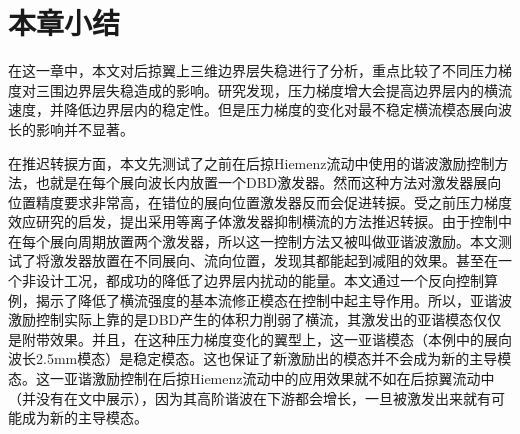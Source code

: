 \section{本章小结}
在这一章中，本文对后掠翼上三维边界层失稳进行了分析，重点比较了不同压力梯度对三围边界层失稳造成的影响。研究发现，压力梯度增大会提高边界层内的横流速度，并降低边界层内的稳定性。但是压力梯度的变化对最不稳定横流模态展向波长的影响并不显著。

在推迟转捩方面，本文先测试了之前在后掠Hiemenz流动中使用的谐波激励控制方法，也就是在每个展向波长内放置一个DBD激发器。然而这种方法对激发器展向位置精度要求非常高，在错位的展向位置激发器反而会促进转捩。受之前压力梯度效应研究的启发，提出采用等离子体激发器抑制横流的方法推迟转捩。由于控制中在每个展向周期放置两个激发器，所以这一控制方法又被叫做亚谐波激励。本文测试了将激发器放置在不同展向、流向位置，发现其都能起到减阻的效果。甚至在一个非设计工况，都成功的降低了边界层内扰动的能量。本文通过一个反向控制算例，揭示了降低了横流强度的基本流修正模态在控制中起主导作用。所以，亚谐波激励控制实际上靠的是DBD产生的体积力削弱了横流，其激发出的亚谐模态仅仅是附带效果。并且，在这种压力梯度变化的翼型上，这一亚谐模态（本例中的展向波长2.5mm模态）是稳定模态。这也保证了新激励出的模态并不会成为新的主导模态。这一亚谐激励控制在后掠Hiemenz流动中的应用效果就不如在后掠翼流动中（并没有在文中展示），因为其高阶谐波在下游都会增长，一旦被激发出来就有可能成为新的主导模态。
